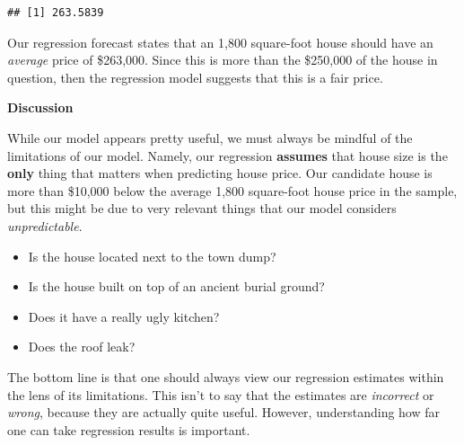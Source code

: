 \documentclass[
]{book}
\newenvironment{Shaded}{\begin{snugshade}}{\end{snugshade}}
\newcommand{\AttributeTok}[1]{\textcolor[rgb]{0.77,0.63,0.00}{#1}}
\newcommand{\DecValTok}[1]{\textcolor[rgb]{0.00,0.00,0.81}{#1}}
\newcommand{\FunctionTok}[1]{\textcolor[rgb]{0.00,0.00,0.00}{#1}}
\newcommand{\NormalTok}[1]{#1}
\newcommand{\OtherTok}[1]{\textcolor[rgb]{0.56,0.35,0.01}{#1}}
\newcommand{\SpecialCharTok}[1]{\textcolor[rgb]{0.00,0.00,0.00}{#1}}
\providecommand{\tightlist}{%
  \setlength{\itemsep}{0pt}\setlength{\parskip}{0pt}}
\begin{document}
\begin{Shaded}
\end{Shaded}

\begin{verbatim}
## [1] 263.5839
\end{verbatim}

Our regression forecast states that an 1,800 square-foot house should have an \emph{average} price of \$263,000. Since this is more than the \$250,000 of the house in question, then the regression model suggests that this is a fair price.

\textbf{Discussion}

While our model appears pretty useful, we must always be mindful of the limitations of our model. Namely, our regression \textbf{assumes} that house size is the \textbf{only} thing that matters when predicting house price. Our candidate house is more than \$10,000 below the average 1,800 square-foot house price in the sample, but this might be due to very relevant things that our model considers \emph{unpredictable}.

\begin{itemize}
\tightlist
\item
  Is the house located next to the town dump?
\item
  Is the house built on top of an ancient burial ground?
\item
  Does it have a really ugly kitchen?
\item
  Does the roof leak?
\end{itemize}

The bottom line is that one should always view our regression estimates within the lens of its limitations. This isn't to say that the estimates are \emph{incorrect} or \emph{wrong}, because they are actually quite useful. However, understanding how far one can take regression results is important.
\end{document}
